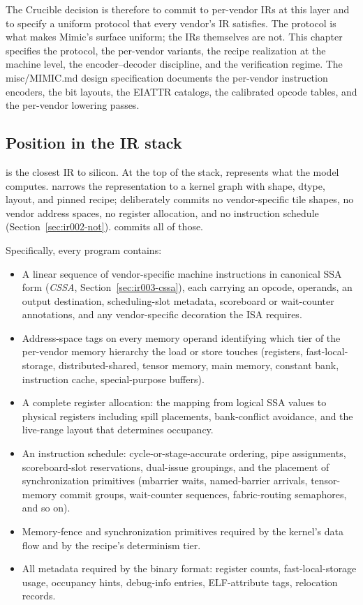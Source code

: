 The Crucible decision is therefore to commit to per-vendor IRs at this layer and to specify a uniform protocol that every vendor's IR satisfies.
The protocol is what makes Mimic's surface uniform; the IRs themselves are not.
This chapter specifies the protocol, the per-vendor variants, the recipe realization at the machine level, the encoder--decoder discipline, and the verification regime.
The misc/MIMIC.md design specification documents the per-vendor instruction encoders, the bit layouts, the EIATTR catalogs, the calibrated opcode tables, and the per-vendor lowering passes.

\subsection{Position in the IR stack}
\label{sec:ir003-position}

 is the closest IR to silicon.
At the top of the stack,  represents what the model computes.
 narrows the representation to a kernel graph with shape, dtype, layout, and pinned recipe;  deliberately commits no vendor-specific tile shapes, no vendor address spaces, no register allocation, and no instruction schedule (Section~\ref{sec:ir002-not}).
 commits all of those.

Specifically, every  program contains:

\begin{itemize}
  \item A linear sequence of vendor-specific machine instructions in canonical SSA form (\emph{CSSA}, Section~\ref{sec:ir003-cssa}), each carrying an opcode, operands, an output destination, scheduling-slot metadata, scoreboard or wait-counter annotations, and any vendor-specific decoration the ISA requires.
  \item Address-space tags on every memory operand identifying which tier of the per-vendor memory hierarchy the load or store touches (registers, fast-local-storage, distributed-shared, tensor memory, main memory, constant bank, instruction cache, special-purpose buffers).
  \item A complete register allocation: the mapping from logical SSA values to physical registers including spill placements, bank-conflict avoidance, and the live-range layout that determines occupancy.
  \item An instruction schedule: cycle-or-stage-accurate ordering, pipe assignments, scoreboard-slot reservations, dual-issue groupings, and the placement of synchronization primitives (mbarrier waits, named-barrier arrivals, tensor-memory commit groups, wait-counter sequences, fabric-routing semaphores, and so on).
  \item Memory-fence and synchronization primitives required by the kernel's data flow and by the recipe's determinism tier.
  \item All metadata required by the binary format: register counts, fast-local-storage usage, occupancy hints, debug-info entries, ELF-attribute tags, relocation records.
\end{itemize}

